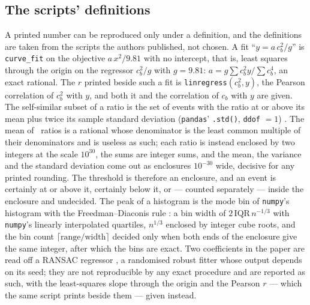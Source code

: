 \documentclass[preprint,11pt,authoryear]{elsarticle}
\begin{document}
\subsection{The scripts' definitions}\label{sec:defs}
A printed number can be reproduced only under a definition, and the definitions are taken from the scripts the authors published, not chosen. A fit ``$y = a\,c_b^2/g$'' is \texttt{curve\_fit} on the objective $a\,x^2/9.81$ with no intercept, that is, least squares through the origin on the regressor $c_b^2/g$ with $g = 9.81$: $a = g \sum c_b^2 y / \sum c_b^4$, an exact rational. The $r$ printed beside such a fit is \texttt{linregress}$(c_b^2, y)$, the Pearson correlation of $c_b^2$ with $y$, and both it and the correlation of $c_b$ with $y$ are given. The self-similar subset of a ratio is the set of events with the ratio at or above its mean plus twice its sample standard deviation (\texttt{pandas}' \texttt{.std()}, \texttt{ddof} $= 1$) \citep{mckinney2010}. The mean of \NEvents\ ratios is a rational whose denominator is the least common multiple of their denominators and is useless as such; each ratio is instead enclosed by two integers at the scale $10^{30}$, the sums are integer sums, and the mean, the variance and the standard deviation come out as enclosures $10^{-30}$ wide, decisive for any printed rounding. The threshold is therefore an enclosure, and an event is certainly at or above it, certainly below it, or --- counted separately --- inside the enclosure and undecided. The peak of a histogram is the mode bin of \texttt{numpy}'s histogram with the Freedman--Diaconis rule \citep{freedman1981,harris2020}: a bin width of $2\,\mathrm{IQR}\,n^{-1/3}$ with \texttt{numpy}'s linearly interpolated quartiles, $n^{1/3}$ enclosed by integer cube roots, and the bin count $\lceil \mathrm{range}/\mathrm{width} \rceil$ decided only when both ends of the enclosure give the same integer, after which the bins are exact. Two coefficients in the paper are read off a RANSAC regressor \citep{fischler1981,pedregosa2011}, a randomised robust fitter whose output depends on its seed; they are not reproducible by any exact procedure and are reported as such, with the least-squares slope through the origin and the Pearson $r$ --- which the same script prints beside them --- given instead.
\end{document}
